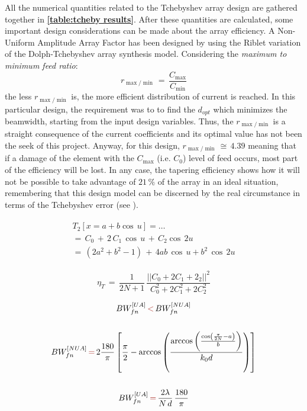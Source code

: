 \documentclass[10pt,a4paper,twocolumn]{article}
\begin{document}
{All the numerical quantities related to the Tchebyshev array design are gathered together in \textbf{\cref{table:tcheby results}}. After these quantities are calculated, some important design considerations can be made about the array efficiency. A Non-Uniform Amplitude Array Factor has been designed by using the Riblet variation of the Dolph-Tchebyshev array synthesis model. Considering the \emph{maximum to minimum feed ratio}: \[r_{\max/\min}\,=\,\frac{C_{\max}}{C_{\min}}\] 
the less $r_{\max/\min}$ is, the more efficient distribution of current is reached. In this particular design, the requirement was to to find the $d_{opt}$ which minimizes the beamwidth, starting from the input design variables. Thus, the $r_{\max/\min}$ is a straight consequence of the current coefficients and its optimal value has not been the seek of this project. Anyway, for this design, $r_{\max/\min}\,\cong\,4.39$ meaning that if a damage of the element with the $C_{\max}$ (i.e. $C_0$) level of feed occurs, most part of the efficiency will be lost. In any case, the tapering efficiency shows how it will not be possible to take advantage of $21\,\%$ of the array in an ideal situation, remembering that this design model can be discerned by the real circumstance in terms of the Tchebyshev error (see \textbf{\cite{Balanis1}}). 

\begin{equation}\begin{split}
		\begin{aligned}
			T_2\left[x=a+b\cos\,u\right]=\dots\\
			=\,C_0\,+\,2\,C_1\,\cos\,u\,+\,C_2\cos\,2u\\
			=\,(2a^2+b^2-1)\,+\,4ab\,\cos\,u+b^2\,\cos\,2u
			\label{eq:tcheby poly coeff}
		\end{aligned}
	\end{split}
\end{equation}

\begin{equation}
	\eta_T\,=\,\frac{1}{2N+1}\,\frac{||C_0+2C_1+2_2||^2}{C_0^2+2C_1^2+2C_2^2}
	\label{eq:tapering efficiency}
\end{equation}

\begin{equation}
	\begin{gathered}
		BW_{fn}^{[UA]}\,{\color{Mahogany}<}\,BW_{fn}^{[NUA]}\\
		\\
		BW_{fn}^{[NUA]}\,{\color{Mahogany}=}\,2\frac{180}{\pi}\left[\frac{\pi}{2}-\arccos\left(\frac{\arccos\left(\frac{\cos\left(\frac{\pi}{2N}-a\right)}{b}\right)}{k_0d}\right)\right]\\
		\\
		BW_{fn}^{[UA]}\,{\color{Mahogany}=}\,\frac{2\lambda}{N\,d}\,\frac{180}{\pi}
	\end{gathered}
	\label{eq:tcheby beamwidth}
\end{equation}

}
\end{document}

